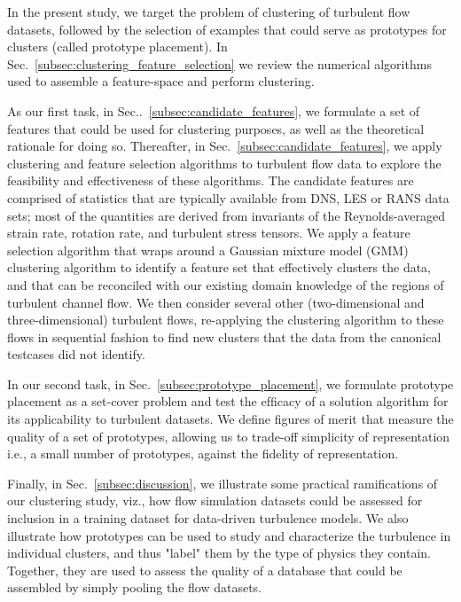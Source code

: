 In the present study, we target the problem of clustering of turbulent ﬂow datasets, followed by the
selection of examples that could serve as prototypes for clusters (called prototype placement). In Sec.~\ref{subsec:clustering_feature_selection} we review the numerical algorithms used to assemble a feature-space and perform clustering.

As our ﬁrst task, in Sec..~\ref{subsec:candidate_features}, we formulate a set of features that could be used for clustering purposes, as well as the theoretical rationale for doing so. Thereafter, in Sec.~\ref{subsec:candidate_features}, we apply clustering and feature selection algorithms to turbulent ﬂow data to explore the feasibility and effectiveness of these algorithms. The candidate features are comprised of statistics that are typically available from DNS, LES or RANS data sets; most of the quantities are derived from invariants of the Reynolds-averaged strain rate, rotation rate, and turbulent stress tensors. %
We apply a feature selection algorithm that wraps around a Gaussian mixture model (GMM) clustering algorithm to identify a feature set that effectively clusters the data, and that can be reconciled with our existing domain knowledge of the regions of turbulent channel ﬂow. We then consider several other (two-dimensional and three-dimensional) turbulent ﬂows, re-applying the clustering algorithm to these ﬂows in sequential fashion to ﬁnd new clusters that the data from the canonical testcases did not identify.

In our second task, in Sec.~\ref{subsec:prototype_placement}, we formulate prototype placement as a set-cover problem and test the efﬁcacy of a solution algorithm for its applicability to turbulent datasets. We deﬁne ﬁgures of merit that measure the quality of a set of prototypes, allowing us to trade-off simplicity of representation i.e., a small number of prototypes, against the ﬁdelity of representation.

Finally, in Sec.~\ref{subsec:discussion}, we illustrate some practical ramiﬁcations of our clustering study, viz., how ﬂow simulation datasets could be assessed for inclusion in a training dataset for data-driven turbulence models. We also illustrate how prototypes can be used to study and characterize the turbulence in individual clusters, and thus "label" them by the type of physics they contain. Together, they are used to assess the quality of a database that could be assembled by simply pooling the ﬂow datasets.

